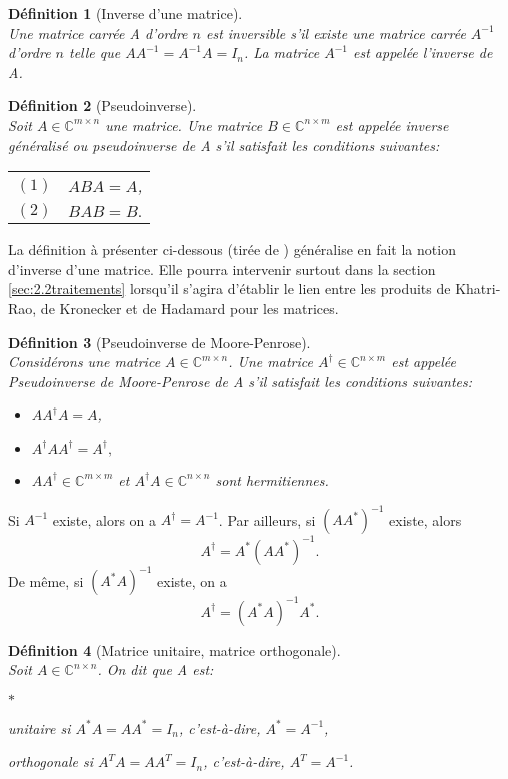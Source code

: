 \documentclass[11pt,a4paper,oneside]{book}
\newtheorem{defi}{Définition}[chapter]
\def\C{\mathbb C}
\begin{document}
\begin{defi}[Inverse d'une matrice]\emph{\\}
	Une matrice carrée A d’ordre $ n $ est inversible s’il existe une matrice carrée $ A^{-1} $ d’ordre
	$ n $ telle que $ AA^{-1} = A^{-1}A = I_{n} $. La matrice $ A^{-1} $ est appelée l’inverse de A.
\end{defi}
\begin{defi}[Pseudoinverse]
\emph{\\}
Soit $ A\in\C^{m\times n} $ une matrice. Une matrice $ B\in\C^{n\times m} $ est appelée inverse généralisé ou pseudoinverse de A s'il satisfait les conditions suivantes:

\begin{tabular}{ll}
$ (1) $ &$ ABA=A $,\\
 $ (2) $&$ BAB=B.$\\
\end{tabular}

\end{defi}
La définition à présenter ci-dessous (tirée de \cite[p.4]{Moore2011}) généralise en fait la notion d'inverse d'une matrice. Elle pourra intervenir surtout dans la section \ref{sec:2.2traitements} lorsqu'il s'agira d'établir le lien entre les produits de Khatri-Rao, de Kronecker et de Hadamard pour les matrices.
\begin{defi}[Pseudoinverse de Moore-Penrose]\label{MOORE}\emph{\\}
Considérons une matrice $ A\in\C^{m\times n} $. Une matrice $ A^{\dagger}\in\C^{n\times m} $ est appelée Pseudoinverse de Moore-Penrose de A s'il satisfait les conditions suivantes:
\begin{itemize}
\item[$ (1) $]$ AA^{\dagger}A=A $,
\item[$ (2) $]$ A^{\dagger}AA^{\dagger}=A^{\dagger}, $
\item[$ (3) $]$ AA^{\dagger} \in\C^{m\times m}$ et $ A^{\dagger}A\in \C^{n\times n} $ sont hermitiennes.
\end{itemize}
\end{defi}
Si $ A^{-1} $ existe, alors on a $ A^{\dagger} = A^{-1} $. Par ailleurs, si $ (AA^{*})^{-1} $ existe, alors
\begin{equation}
	A^{\dagger}=A^{*}(AA^{*})^{-1}.
\end{equation} De même, si $ (A^{*}A)^{-1} $ existe, on a
\begin{equation}
A^{\dagger}=\left(A^{*}A\right)^{-1}A^{*}.
\end{equation}
\begin{defi}[Matrice unitaire, matrice orthogonale]
	\emph{\\}
	Soit $ A\in\C^{n\times n} $. On dit que A est:
	\begin{list}{$ \ast $}{}
		\item
		unitaire si $ A^{*}A=AA^{*}=I_{n} $, c'est-à-dire, $ A^{*}=A^{-1} $,
		\item
		orthogonale si $ A^{T}A=AA^{T}=I_{n}$, c'est-à-dire, $ A^{T}=A^{-1} $.
	\end{list}
\end{defi}
\end{document}
